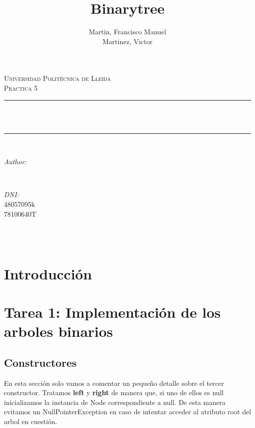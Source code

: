 \documentclass{article}
\title{Binarytree}
\author{Martin, Francisco Manuel \\
Martinez, Victor
}
\makeatletter
\let\thetitle\@title
\let\theauthor\@author
\let\thedate\@date
\makeatother
\begin{document}
    \begin{titlepage}
        \centering
        \vspace*{0.5 cm}

        \textsc{\LARGE Universidad Politécnica de Lleida}\\[2.0 cm]	%
        \textsc{\large Practica 5}\\[0.5 cm]				%
        \rule{\linewidth}{0.2 mm} \\[0.4 cm]
        { \huge \bfseries \thetitle}\\
        \rule{\linewidth}{0.2 mm} \\[1.5 cm]

        \begin{minipage}{0.4\textwidth}
            \begin{flushleft} \large
            \emph{Author:}\\
            \theauthor
            \end{flushleft}
        \end{minipage}~
        \begin{minipage}{0.4\textwidth}
            \begin{flushright} \large
            \emph{DNI:} \\
            48057095k \\
            78100640T%
            \end{flushright}
        \end{minipage}\\[2 cm]

        {\large \thedate}\\[2 cm]

        \vfill

    \end{titlepage}
    \tableofcontents
    \pagebreak

    \section{Introducción}

    \section{Tarea 1: Implementación de los arboles binarios}
    \subsection{Constructores}
    En esta sección solo vamos a comentar un pequeño detalle sobre el tercer constructor. \newline
    Tratamos \textbf{left} y \textbf{right} de manera que, si uno de ellos es null inicializamos la instancia de Node correspondiente a null. \newline
    De esta manera evitamos un NullPointerException en caso de intentar acceder al atributo root del arbol en cuestión.
\end{document}
